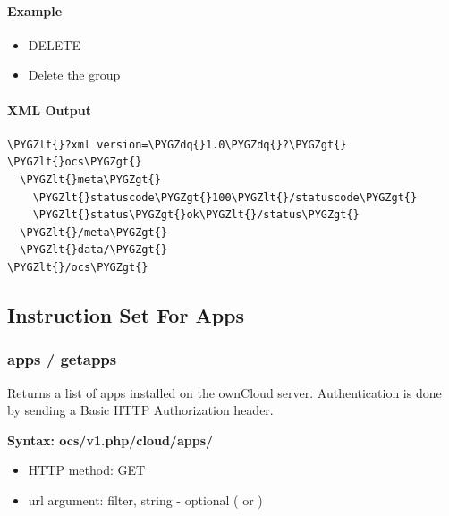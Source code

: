 \documentclass[letterpaper,10pt,english]{sphinxmanual}
\def\PYGZlt{\char`\<}
\def\PYGZgt{\char`\>}
\def\PYGZdq{\char`\"}
\begin{document}
\paragraph{Example}
\label{configuration_user/user_provisioning_api:id28}\begin{itemize}
\item {} 
DELETE 

\item {} 
Delete the group 

\end{itemize}


\paragraph{XML Output}
\label{configuration_user/user_provisioning_api:id29}
\begin{Verbatim}[commandchars=\\\{\}]
\PYGZlt{}?xml version=\PYGZdq{}1.0\PYGZdq{}?\PYGZgt{}
\PYGZlt{}ocs\PYGZgt{}
  \PYGZlt{}meta\PYGZgt{}
    \PYGZlt{}statuscode\PYGZgt{}100\PYGZlt{}/statuscode\PYGZgt{}
    \PYGZlt{}status\PYGZgt{}ok\PYGZlt{}/status\PYGZgt{}
  \PYGZlt{}/meta\PYGZgt{}
  \PYGZlt{}data/\PYGZgt{}
\PYGZlt{}/ocs\PYGZgt{}
\end{Verbatim}


\subsection{Instruction Set For Apps}
\label{configuration_user/user_provisioning_api:instruction-set-for-apps}

\subsubsection{\textbf{apps / getapps}}
\label{configuration_user/user_provisioning_api:apps-getapps}
Returns a list of apps installed on the ownCloud server. Authentication is done
by sending a Basic HTTP Authorization
header.

\textbf{Syntax: ocs/v1.php/cloud/apps/}
\begin{itemize}
\item {} 
HTTP method: GET

\item {} 
url argument: filter, string - optional ( or )

\end{itemize}
\end{document}
